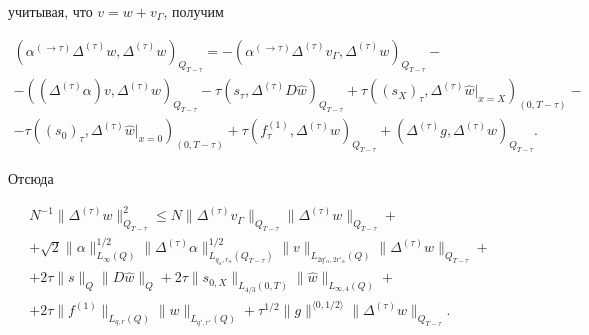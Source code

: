 учитывая, что $v=w+v_{\Gamma}$, получим


\begin{multline*}


(\alpha^{(\to\tau)}\varDelta^{(\tau)}w,\varDelta^{(\tau)}w)_{Q_{T-\tau}}


= -(\alpha^{(\to\tau)}\varDelta^{(\tau)}v_{\Gamma},


\varDelta^{(\tau)}w)_{Q_{T-\tau}}-\\


-((\varDelta^{(\tau)}\alpha)v,\varDelta^{(\tau)}w)_{Q_{T-\tau}}


-\tau(s_{\tau},\varDelta^{(\tau)}D\widehat w)_{Q_{T-\tau}}


+\tau((s_X)_{\tau}, \varDelta^{(\tau)}\widehat w|_{x=X})_{(0,T-\tau)}-\\


-\tau((s_0)_{\tau},\varDelta^{(\tau)}\widehat w|_{x=0})_{(0,T-\tau)}


+\tau(f^{(1)}_{\tau},\varDelta^{(\tau)} w)_{Q_{T-\tau}}


+(\varDelta^{(\tau)}g,\varDelta^{(\tau)} w)_{Q_{T-\tau}}.


\end{multline*}


Отсюда


\begin{multline*}


N^{-1}\|\varDelta^{(\tau)}w\|^2_{Q_{T-\tau}}\le


N\|\varDelta^{(\tau)}v_{\Gamma}\|_{Q_{T-\tau}}\|


\varDelta^{(\tau)}w\|_{Q_{T-\tau}}+\\


+\sqrt{2}\|\alpha\|_{L_{\infty}(Q)}^{1/2}


\|\varDelta^{(\tau)}\alpha\|_{L_{q_{\alpha},r_{\alpha}}(Q_{T-\tau})}^{1/2}


\|v\|_{L_{2q'_\alpha,2r'_\alpha}(Q)}\|\varDelta^{(\tau)}w\|_{Q_{T-\tau}}+\\


+2\tau\|s\|_Q\|D\widehat w\|_Q +


2\tau\|s_{0,X}\|_{L_{4/3}(0,T)}\|\widehat w\|_{L_{\infty,4}(Q)}+\\


+2\tau\|f^{(1)}\|_{L_{q,r}(Q)}\|w\|_{L_{q',r'}(Q)}


+\tau^{1/2}\|g\|^{\langle 0,1/2\rangle}\|\varDelta^{(\tau)} w\|_{Q_{T-\tau}}.


\end{multline*}


